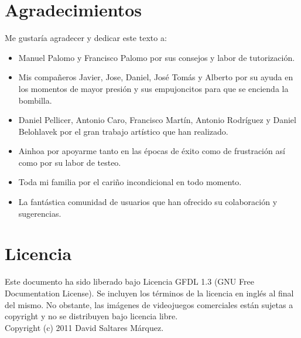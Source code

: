 

\section*{Agradecimientos}

Me gustaría agradecer y dedicar este texto a:

\begin{itemize}
    \itemsep0em
    \item Manuel Palomo y Francisco Palomo por sus consejos y labor de tutorización.
    \item Mis compañeros Javier, Jose, Daniel, José Tomás y Alberto por su ayuda
    en los momentos de mayor presión y sus empujoncitos para que se encienda
    la bombilla.
    \item Daniel Pellicer, Antonio Caro, Francisco Martín, Antonio
    Rodríguez y Daniel Belohlavek por el gran trabajo artístico que han
    realizado.
    \item Ainhoa por apoyarme tanto en las épocas de éxito como de
    frustración así como por su labor de testeo.
    \item Toda mi familia por el cariño incondicional en todo momento.
    \item La fantástica comunidad de usuarios que han ofrecido su colaboración
    y sugerencias.
\end{itemize}

\cleardoublepage

\section*{Licencia} %

Este documento ha sido liberado bajo Licencia GFDL 1.3 (GNU Free
Documentation License). Se incluyen los términos de la licencia en
inglés al final del mismo. No obstante, las imágenes de videojuegos
comerciales están sujetas a copyright y no se distribuyen bajo licencia
libre.\\

Copyright (c) 2011 David Saltares Márquez.\\

